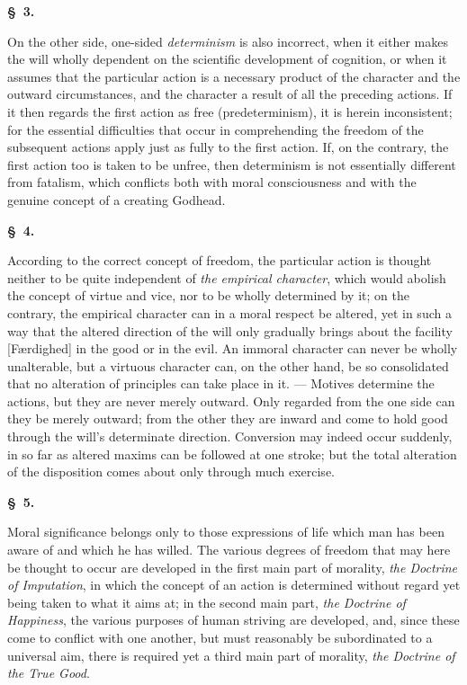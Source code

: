 \documentclass[12pt]{article}
\newcommand{\opage}[1]{\marginnote{\footnotesize\textit{[#1]}}}
\newcommand{\slaw}[1]{\par\medskip\begin{center}\textbf{\S~#1.}\end{center}\nopagebreak}
\begin{document}
\slaw{3}
On the other side, one-sided \emph{determinism} is also incorrect, when it either makes the will wholly dependent on the scientific development of cognition, or when it assumes that the particular action is a necessary product of the character and the outward circumstances, and the character a result of all the preceding actions. If it then regards the first action as free (predeterminism), it is herein inconsistent; for the essential difficulties that occur in comprehending the freedom of the subsequent actions apply just as fully to the first action. If, on the contrary, the first action too is taken to be unfree, \opage{143}then determinism is not essentially different from fatalism, which conflicts both with moral consciousness and with the genuine concept of a creating Godhead.

\slaw{4}
According to the correct concept of freedom, the particular action is thought neither to be quite independent of \emph{the empirical character}, which would abolish the concept of virtue and vice, nor to be wholly determined by it; on the contrary, the empirical character can in a moral respect be altered, yet in such a way that the altered direction of the will only gradually brings about the facility [Færdighed] in the good or in the evil. An immoral character can never be wholly unalterable, but a virtuous character can, on the other hand, be so consolidated that no alteration of principles can take place in it. --- Motives determine the actions, but they are never merely outward. Only regarded from the one side can they be merely outward; from the other they are inward and come to hold good through the will's determinate direction. Conversion may indeed occur suddenly, in so far as altered maxims can be followed at one stroke; but the total alteration of the disposition comes about only through much exercise.

\slaw{5}
Moral significance belongs only to those expressions of life which man has been aware of and which he has willed. The various degrees of freedom that may here be thought to occur are developed in the first main part of morality, \emph{the Doctrine of Imputation}, in which the concept of an action is determined without regard yet being taken to what it aims at; in the second main part, \emph{the Doctrine of Happiness}, the various purposes of human striving are developed, and, since these come to conflict with one another, but must reasonably be subordinated to a universal aim, there is required yet a third main part of morality, \emph{the Doctrine of the True Good}.
\end{document}
